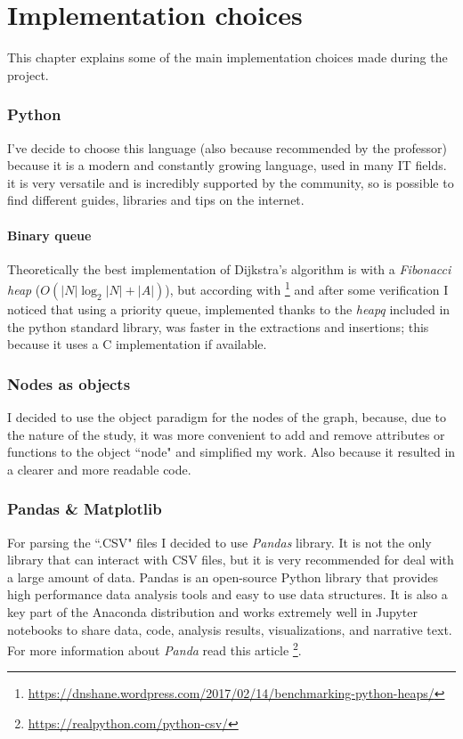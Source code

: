 \documentclass[a4paper,11pt]{report}
\begin{document}
\chapter{Implementation choices}
This chapter explains some of the main implementation choices made during the project.
\subsection{Python}
I've decide to choose this language (also because recommended by the professor) because it is a modern and constantly growing language, used in many IT fields. it is very versatile and is incredibly supported by the community, so is possible to find different guides, libraries and tips on the internet.
\subsubsection{Binary queue}
Theoretically the best implementation of Dijkstra's algorithm is with a \textit{Fibonacci heap} ($O(|N|\log_2|N|+|A|)$), but according with \footnote{\url{https://dnshane.wordpress.com/2017/02/14/benchmarking-python-heaps/}} and after some verification I noticed that using a priority queue, implemented thanks to the \textit{heapq} included in the python standard library, was faster in the extractions and insertions; this because it uses a C implementation if available.

\subsection{Nodes as objects}
I decided to use the object paradigm for the nodes of the graph, because, due to the nature of the study, it was more convenient to add and remove attributes or functions to the object ``node" and simplified my work. Also because it resulted in a clearer and more readable code.
\subsection{Pandas \& Matplotlib}
For parsing the ``.CSV" files I decided to use \textit{Pandas} library. It is not the only library that can interact with CSV files, but it is very recommended for deal with a large amount of data.
Pandas is an open-source Python library that provides high performance data analysis tools and easy to use data structures. It is also a key part of the Anaconda distribution and works extremely well in Jupyter notebooks to share data, code, analysis results, visualizations, and narrative text. For more information about \textit{Panda} read this article \footnote{\url{https://realpython.com/python-csv/}}.
\vspace{5mm}
\end{document}
